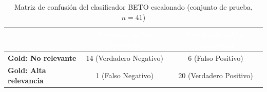 \vspace{0.5cm}
\begin{table}[htbp]
\centering
\caption{Matriz de confusión del clasificador BETO escalonado (conjunto de prueba, $n=41$)}
\label{tab:confusion_matrix}
\renewcommand{\arraystretch}{1.4}
\begin{tabular}{|l|c|c|}
\hline
\rowcolor{black}
 & \textcolor{white}{\textbf{Predicción: No relevante}} &
   \textcolor{white}{\textbf{Predicción: Alta relevancia}} \\
\hline
\textbf{Gold: No relevante} & 14 (Verdadero Negativo) & 6 (Falso Positivo) \\
\hline
\textbf{Gold: Alta relevancia} & 1 (Falso Negativo) & 20 (Verdadero Positivo) \\
\hline
\end{tabular}
\end{table}
\vspace{0.4cm}
